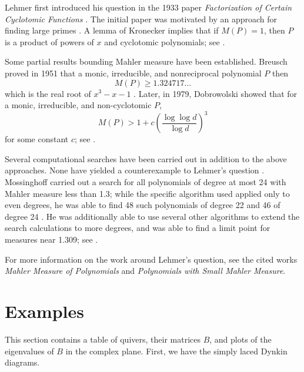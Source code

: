 \documentclass{amsart}
\theoremstyle{theorem}
\theoremstyle{theorem*}
\theoremstyle{definition}
\begin{document}
Lehmer first introduced his question in the 1933 paper \textit{Factorization of
    Certain Cyclotomic Functions} \cite{l}. The initial paper was motivated by
an approach for finding large primes \cite{ln}. A lemma of Kronecker implies
that if $M(P) = 1$, then $P$ is a product of powers of $x$ and cyclotomic
polynomials; see \cite{ln}.

Some partial results bounding Mahler measure have been established. Breusch
proved in 1951 that a monic, irreducible, and nonreciprocal polynomial $P$ then
$$M(P) \geq 1.324717\dots$$ which is the real root of $x^3 - x - 1$ \cite{ln}.
Later, in 1979, Dobrowolski showed that for a monic, irreducible, and
non-cyclotomic $P$,
$$M(P) > 1 + c \left(\frac{\log \log d}{\log d}\right)^3$$ for some constant $c$;
see \cite{ln}.

Several computational searches have been carried out in addition to the above
approaches. None have yielded a counterexample to Lehmer's question \cite{m}.
Mossinghoff carried out a search for all polynomials of degree at most 24 with
Mahler measure less than 1.3; while the specific algorithm used applied only to
even degrees, he was able to find 48 such polynomials of degree 22 and 46 of
degree 24 \cite{m}. He was additionally able to use several other algorithms to
extend the search calculations to more degrees, and was able to find a limit
point for measures near 1.309; see \cite{m}.

For more information on the work around Lehmer's question, see the cited works
\textit{Mahler Measure of Polynomials} and \textit{Polynomials with Small Mahler
    Measure}.

\section*{Examples}

This section contains a table of quivers, their matrices $B$, and plots of the
eigenvalues of $B$ in the complex plane. First, we have the simply laced Dynkin
diagrams.
\end{document}
